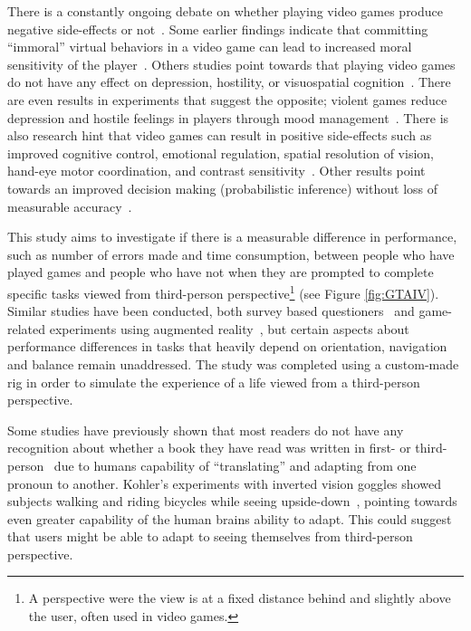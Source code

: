 \documentclass[runningheads,a4paper,oribibl]{llncs}
\begin{document}
There is a constantly ongoing debate on whether playing video games produce negative side-effects or not~\cite{tear2014video}. Some earlier findings indicate that committing ``immoral'' virtual behaviors in a video game can lead to increased moral sensitivity of the player~\cite{grizzard2014being}. Others studies point towards that playing video games do not have any effect on depression, hostility, or visuospatial cognition~\cite{valadez2012just}. There are even results in experiments that suggest the opposite; violent games reduce depression and hostile feelings in players through mood management~\cite{ferguson2015hitman}. There is also research hint that video games can result in positive side-effects such as improved cognitive control, emotional regulation, spatial resolution of vision, hand-eye motor coordination, and contrast sensitivity~\cite{gong2015enhanced}. Other results point towards an improved decision making (probabilistic inference) without loss of measurable accuracy~\cite{green2010improved}.

This study aims to investigate if there is a measurable difference in performance, such as number of errors made and time consumption, between people who have played games and people who have not when they are prompted to complete specific tasks viewed from third-person perspective\footnote{A perspective were the view is at a fixed distance behind and slightly above the user, often used in video games.} (see Figure \ref{fig:GTAIV}). Similar studies have been conducted, both survey based questioners~\cite{schmierbach2011exploring} and game-related experiments using augmented reality~\cite{nakamura20103pi}, but certain aspects about performance differences in tasks that heavily depend on orientation, navigation and balance remain unaddressed. The study was completed using a custom-made rig in order to simulate the experience of a life viewed from a third-person perspective.

Some studies have previously shown that most readers do not have any recognition about whether a book they have read was written in first- or third-person~\cite{hagg2012nya} due to humans capability of ``translating'' and adapting from one pronoun to another. Kohler's experiments with inverted vision goggles showed subjects walking and riding bicycles while seeing upside-down~\cite{kohler1962goggles}, pointing towards even greater capability of the human brains ability to adapt. This could suggest that users might be able to adapt to seeing themselves from third-person perspective.
\end{document}
